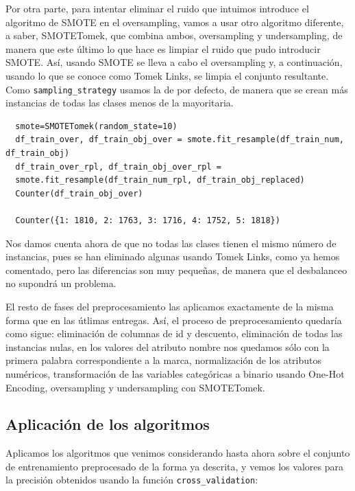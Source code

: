\documentclass[a4paper,11pt]{article}
\begin{document}
  Por otra parte, para intentar eliminar el ruido que intuimos introduce el algoritmo de SMOTE en el oversampling, vamos a usar otro algoritmo diferente, a saber, SMOTETomek, que combina ambos, oversampling y undersampling, de manera que este último lo que hace es limpiar el ruido que pudo introducir SMOTE. Así, usando SMOTE se lleva a cabo el oversampling y, a continuación, usando lo que se conoce como Tomek Links, se limpia el conjunto resultante. Como \texttt{sampling_strategy} usamos la de por defecto, de manera que se crean más instancias de todas las clases menos de la mayoritaria. 
  \begin{verbatim}
  smote=SMOTETomek(random_state=10)
  df_train_over, df_train_obj_over = smote.fit_resample(df_train_num, df_train_obj)
  df_train_over_rpl, df_train_obj_over_rpl = 
  smote.fit_resample(df_train_num_rpl, df_train_obj_replaced)
  Counter(df_train_obj_over)
  
  Counter({1: 1810, 2: 1763, 3: 1716, 4: 1752, 5: 1818})
  \end{verbatim}
  
  Nos damos cuenta ahora de que no todas las clases tienen el mismo número de instancias, pues se han eliminado algunas usando Tomek Links, como ya hemos comentado, pero las diferencias son muy pequeñas, de manera que el desbalanceo no supondrá un problema. 
  
  El resto de fases del preprocesamiento las aplicamos exactamente de la misma forma que en las útlimas entregas. Así, el proceso de preprocesamiento quedaría como sigue: eliminación de columnas de id y descuento, eliminación de todas las instancias nulas, en los valores del atributo nombre nos quedamos sólo con la primera palabra correspondiente a la marca, normalización de los atributos numéricos, transformación de las variables categóricas a binario usando One-Hot Encoding, oversampling y undersampling con SMOTETomek.
  
  \subsection{Aplicación de los algoritmos}
  Aplicamos los algoritmos que venimos considerando hasta ahora sobre el conjunto de entrenamiento preprocesado de la forma ya descrita, y vemos los valores para la precisión obtenidos usando la función \texttt{cross_validation}:
  
\end{document}
